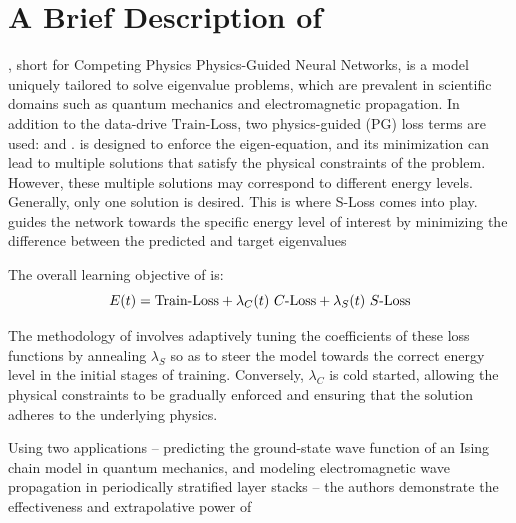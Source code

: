 \documentclass[letterpaper]{article} %
\begin{document}
    \section{A Brief Description of \cophy{}} \label{app:cophy}


\cophy{} \cite{elhamod2022cophy}, short for Competing Physics Physics-Guided Neural Networks, is a model uniquely tailored to solve eigenvalue problems, which are prevalent in scientific domains such as quantum mechanics and electromagnetic propagation. In addition to the data-drive $\text{Train-Loss}$, two physics-guided (PG) loss terms are used: \text{\nsloss{}} and \text{\eloss{}}.\text{\nsloss{}} is designed to enforce the eigen-equation, and its minimization can lead to multiple solutions that satisfy the physical constraints of the problem. However, these multiple solutions may correspond to different energy levels. Generally, only one solution is desired. This is where S-Loss comes into play. \text{\eloss{}} guides the network towards the specific energy level of interest by minimizing the difference between the predicted and target eigenvalues

The overall learning objective of \cophy{} is:
\begin{equation}
    E(t) = \text{Train-Loss} + \lambda_C(t) ~ \text{$C$-Loss{}{}} + \lambda_S(t)  ~\text{$S$-Loss{}}
\end{equation}


The methodology of \cophy{} involves adaptively tuning the coefficients of these loss functions by annealing \( \lambda_S \) so as to steer the model towards the correct energy level in the initial stages of training. Conversely, \( \lambda_C \) is cold started, allowing the physical constraints to be gradually enforced and ensuring that the solution adheres to the underlying physics.

Using two applications – predicting the ground-state wave function of an Ising chain model in quantum mechanics, and modeling electromagnetic wave propagation in periodically stratified layer stacks – the authors demonstrate the effectiveness and extrapolative power of \cophy
\end{document}
